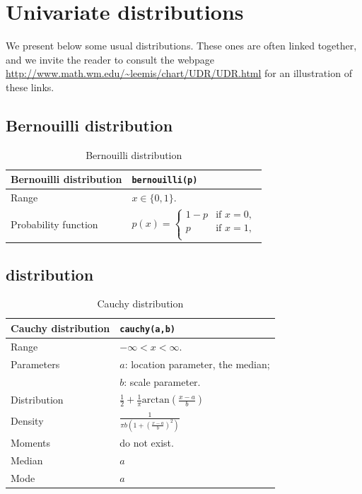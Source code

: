 \section{Univariate distributions}

We present below some usual distributions.
These ones are often linked together, and we invite the reader to consult the webpage \url{http://www.math.wm.edu/~leemis/chart/UDR/UDR.html} for an illustration of these links.

\subsection{Bernouilli distribution}

\begin{table}[htb]
\begin{tabularx}{\textwidth}{lX}
Bernouilli distribution & \verb|bernouilli(p)| \\
\hline
Range & $x \in \lbrace 0, 1 \rbrace$. \\
Probability function & $p(x) = \begin{cases}
1 - p & \mbox{if } x = 0, \\
p & \mbox{if } x = 1, \\
\end{cases}$ \\
\hline
\end{tabularx}
\caption{Bernouilli distribution}
\end{table}

\subsection{ distribution}

\begin{table}[htb]
\begin{tabularx}{\textwidth}{ll}
Cauchy distribution & \verb|cauchy(a,b)| \\
\hline
Range & $-\infty < x < \infty$.\\
Parameters & $a$: location parameter, the median; \\
& $b$: scale parameter. \\
Distribution &
$\frac{1}{2}+\frac{1}{\pi}\mbox{arctan}\left(\frac{x-a}{b}\right)$ \\
Density &
$\frac{1}{\pi b \left( 1+ \left( \frac{x-a}{b} \right)^2 \right)}$ \\
Moments & do not exist.\\
Median & $a$ \\
Mode & $a$ \\
\hline
\end{tabularx}
\caption{Cauchy distribution}
\end{table}

